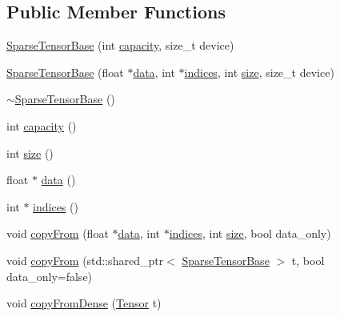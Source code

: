 \subsection*{Public Member Functions}
\begin{DoxyCompactItemize}
\item 
\hyperlink{classmarian_1_1SparseTensorBase_a14749b9a7f78366bfe1cc9695c132128}{Sparse\+Tensor\+Base} (int \hyperlink{classmarian_1_1SparseTensorBase_a7f9b952552b3310028356e9062f8dbcb}{capacity}, size\+\_\+t device)
\item 
\hyperlink{classmarian_1_1SparseTensorBase_a7e958f74b9bda76d07ae95b0c1323037}{Sparse\+Tensor\+Base} (float $\ast$\hyperlink{classmarian_1_1SparseTensorBase_aff6f84e8e953b957e131c474c4485563}{data}, int $\ast$\hyperlink{classmarian_1_1SparseTensorBase_a6b3971141be6c3baddc84d70eea1f0c2}{indices}, int \hyperlink{classmarian_1_1SparseTensorBase_af8c34e3fb5b12c7a65dbe6892c5ca0d1}{size}, size\+\_\+t device)
\item 
\hyperlink{classmarian_1_1SparseTensorBase_a0ea47eeb67b66813f10e6a47eaa24208}{$\sim$\+Sparse\+Tensor\+Base} ()
\item 
int \hyperlink{classmarian_1_1SparseTensorBase_a7f9b952552b3310028356e9062f8dbcb}{capacity} ()
\item 
int \hyperlink{classmarian_1_1SparseTensorBase_af8c34e3fb5b12c7a65dbe6892c5ca0d1}{size} ()
\item 
float $\ast$ \hyperlink{classmarian_1_1SparseTensorBase_aff6f84e8e953b957e131c474c4485563}{data} ()
\item 
int $\ast$ \hyperlink{classmarian_1_1SparseTensorBase_a6b3971141be6c3baddc84d70eea1f0c2}{indices} ()
\item 
void \hyperlink{classmarian_1_1SparseTensorBase_a8cde6c7346cf727cd195dc36527db4c0}{copy\+From} (float $\ast$\hyperlink{classmarian_1_1SparseTensorBase_aff6f84e8e953b957e131c474c4485563}{data}, int $\ast$\hyperlink{classmarian_1_1SparseTensorBase_a6b3971141be6c3baddc84d70eea1f0c2}{indices}, int \hyperlink{classmarian_1_1SparseTensorBase_af8c34e3fb5b12c7a65dbe6892c5ca0d1}{size}, bool data\+\_\+only)
\item 
void \hyperlink{classmarian_1_1SparseTensorBase_a4392bbfef3fd38761890e1160a070e99}{copy\+From} (std\+::shared\+\_\+ptr$<$ \hyperlink{classmarian_1_1SparseTensorBase}{Sparse\+Tensor\+Base} $>$ t, bool data\+\_\+only=false)
\item 
void \hyperlink{classmarian_1_1SparseTensorBase_a794e424ecff64e4f6030ab684a02b7e3}{copy\+From\+Dense} (\hyperlink{namespacemarian_a88b71ec34bb354564cddc24eb80f7e14}{Tensor} t)

\end{DoxyCompactItemize}

